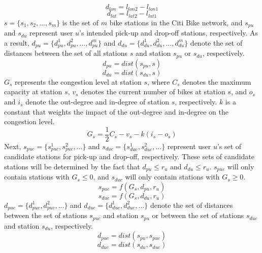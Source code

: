 \documentclass[times, 10pt,twocolumn]{article}
\begin{document}
\begin{equation}
d_{lon} = l_{lon2} - l_{lon1}
\end{equation}
\begin{equation}
d_{lat} = l_{lat2} - l_{lat1}
\end{equation}
$s = \{s_1, s_2, ..., s_m\}$ is the set of $m$ bike stations in the Citi Bike network, and $s_{pu}$ and $s_{du}$ represent user $u$'s intended pick-up and drop-off stations, respectively. As a result, $d_{pu} = \{d_{pu}^1, d_{pu}^2, ..., d_{pu}^m\}$ and $d_{du} = \{d_{du}^1, d_{du}^2, ..., d_{du}^m\}$ denote the set of distances between the set of all stations $s$ and station $s_{pu}$ or $s_{du}$, respectively.
\begin{equation}
d_{pu} = dist(s_{pu}, s)
\end{equation}
\begin{equation}
d_{du} = dist(s_{du}, s)
\end{equation}
$G_s$ represents the congestion level at station $s$, where $C_s$ denotes the maximum capacity at station $s$, $v_s$ denotes the current number of bikes at station $s$, and $o_s$ and $i_s$ denote the out-degree and in-degree of station $s$, respectively. $k$ is a constant that weights the impact of the out-degree and in-degree on the congestion level.
\begin{equation}
G_s = \frac{1}{2}C_s - v_s - k(i_s - o_s)
\end{equation}
Next, $s_{puc} = \{s_{puc}^1, s_{puc}^2, ...\}$ and $s_{duc} = \{s_{duc}^1, s_{duc}^2, ...\}$ represent user $u$'s set of candidate stations for pick-up and drop-off, respectively. These sets of candidate stations will be determined by the fact that $d_{pu} \leq r_u$ and $d_{du} \leq r_u$. $s_{puc}$ will only contain stations with $G_s \leq 0$, and $s_{duc}$ will only contain stations with $G_s \geq 0$.
\begin{equation}
s_{puc} = f(G_s, d_{pu}, r_u)
\end{equation}
\begin{equation}
s_{duc} = f(G_s, d_{du}, r_u)
\end{equation}
$d_{puc} = \{d_{puc}^1, d_{puc}^2, ...\}$ and $d_{duc} = \{d_{duc}^1, d_{duc}^2, ...\}$ denote the set of distances between the set of stations $s_{puc}$ and station $s_{pu}$ or between the set of stations $s_{duc}$ and station $s_{du}$, respectively.
\begin{equation}
d_{puc} = dist(s_{pu}, s_{puc})
\end{equation}
\begin{equation}
d_{duc} = dist(s_{du}, s_{duc})
\end{equation}
\end{document}
